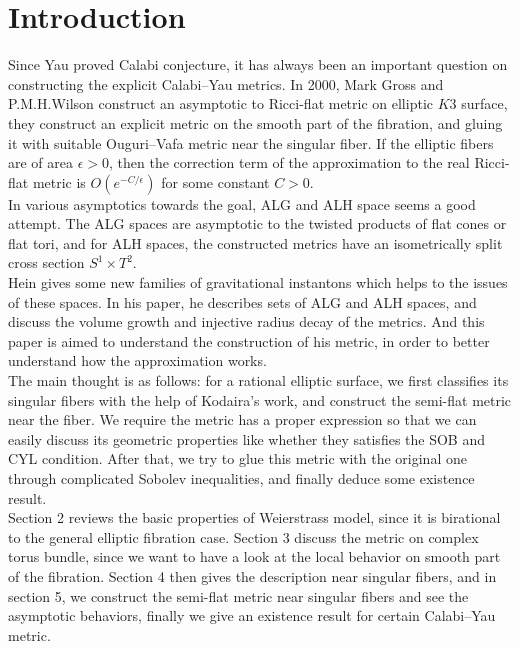 
\section{Introduction}
Since Yau proved \cite{yau1978ricci} Calabi conjecture, it has always been an important question on constructing the explicit Calabi--Yau metrics. In 2000, Mark Gross and P.M.H.Wilson construct \cite{gross2000large} an asymptotic to Ricci-flat metric on elliptic $K3$ surface, they construct an explicit metric on the smooth part of the fibration, and gluing it with suitable Ouguri--Vafa metric \cite{ooguri1996summing} near the singular fiber. If the elliptic fibers are of area $\epsilon>0$, then the correction term of the approximation to the real Ricci-flat metric is $O(e^{-C/\epsilon})$ for some constant $C>0$.\\ \indent
In various asymptotics towards the goal, ALG and ALH space seems a good attempt. The ALG spaces are asymptotic to the twisted products of flat cones or flat tori, and for ALH spaces, the constructed metrics have an isometrically split cross section $S^1\times T^2$.\\ \indent
Hein gives \cite{hein2012gravitational} some new families of gravitational instantons which helps to the issues of these spaces. In his paper, he describes sets of ALG and ALH spaces, and discuss the volume growth and injective radius decay of the metrics. And this paper is aimed to understand the construction of his metric, in order to better understand how the approximation works.\\ \indent
The main thought is as follows: for a rational elliptic surface, we first classifies its singular fibers with the help of Kodaira's work, and construct the semi-flat metric near the fiber. We require the metric has a proper expression so that we can easily discuss its geometric properties like whether they satisfies the SOB and CYL condition. After that, we try to glue this metric with the original one through complicated Sobolev inequalities, and finally deduce some existence result.\\ \indent
Section 2 reviews the basic properties of Weierstrass model, since it is birational to the general elliptic fibration case. Section 3 discuss the metric on complex torus bundle, since we want to have a look at the  local behavior on smooth part of the fibration. Section 4 then gives the description near singular fibers, and in section 5, we construct the semi-flat metric near singular fibers and see the asymptotic behaviors, finally we give an existence result for certain Calabi--Yau metric.


